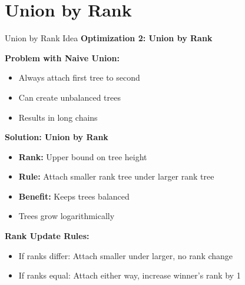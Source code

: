 \documentclass[aspectratio=169]{beamer}
\begin{document}
\section{Union by Rank}

\begin{frame}{Union by Rank Idea}
  \textbf{Optimization 2: Union by Rank}

  \vspace{0.3cm}
  \textbf{Problem with Naive Union:}
  \begin{itemize}
    \item Always attach first tree to second
    \item Can create unbalanced trees
    \item Results in long chains
  \end{itemize}

  \vspace{0.5cm}
  \textbf{Solution: Union by Rank}
  \begin{itemize}
    \item \textbf{Rank:} Upper bound on tree height
    \item \textbf{Rule:} Attach smaller rank tree under larger rank tree
    \item \textbf{Benefit:} Keeps trees balanced
    \item Trees grow logarithmically
  \end{itemize}

  \vspace{0.5cm}
  \textbf{Rank Update Rules:}
  \begin{itemize}
    \item If ranks differ: Attach smaller under larger, no rank change
    \item If ranks equal: Attach either way, increase winner's rank by 1
  \end{itemize}
\end{frame}
\end{document}
